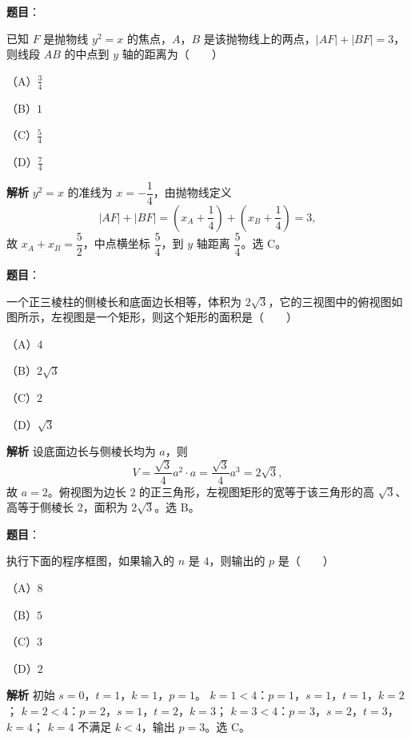 \begin{answer}

\textbf{题目}：

已知 $F$ 是抛物线 $y^2=x$ 的焦点，$A$，$B$ 是该抛物线上的两点，$|AF|+|BF|=3$，则线段 $AB$ 的中点到 $y$ 轴的距离为\mbox{（　　）}

（A）$\frac34$

（B）$1$

（C）$\frac54$

（D）$\frac74$

\textbf{解析}
$y^2=x$ 的准线为 $x=-\dfrac14$，由抛物线定义
\nopagebreak[4]
\[|AF|+|BF|=\left(x_A+\frac14\right)+\left(x_B+\frac14\right)=3,\]
故 $x_A+x_B=\dfrac52$，中点横坐标 $\dfrac54$，到 $y$ 轴距离 $\dfrac54$。选 C。


\end{answer}
\begin{answer}

\textbf{题目}：

一个正三棱柱的侧棱长和底面边长相等，体积为 $2\sqrt3$，它的三视图中的俯视图如图所示，左视图是一个矩形，则这个矩形的面积是\mbox{（　　）}

（A）$4$

（B）$2\sqrt3$

（C）$2$

（D）$\sqrt3$
\nopagebreak[4]
\begin{center}\end{center}
\nopagebreak[4]
\textbf{解析}
设底面边长与侧棱长均为 $a$，则
\nopagebreak[4]
\[V=\frac{\sqrt3}4a^2\cdot a=\frac{\sqrt3}4a^3=2\sqrt3,\]
故 $a=2$。俯视图为边长 $2$ 的正三角形，左视图矩形的宽等于该三角形的高 $\sqrt3$、高等于侧棱长 $2$，面积为 $2\sqrt3$。选 B。


\end{answer}
\begin{answer}

\textbf{题目}：

执行下面的程序框图，如果输入的 $n$ 是 $4$，则输出的 $p$ 是\mbox{（　　）}

（A）$8$

（B）$5$

（C）$3$

（D）$2$
\nopagebreak[4]
\begin{center}\end{center}
\nopagebreak[4]
\textbf{解析}
初始 $s=0$，$t=1$，$k=1$，$p=1$。
$k=1<4$：$p=1$，$s=1$，$t=1$，$k=2$；
$k=2<4$：$p=2$，$s=1$，$t=2$，$k=3$；
$k=3<4$：$p=3$，$s=2$，$t=3$，$k=4$；
$k=4$ 不满足 $k<4$，输出 $p=3$。选 C。


\end{answer}
